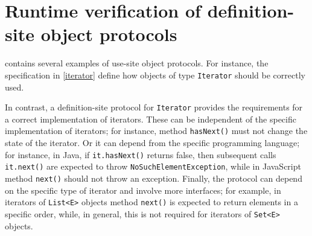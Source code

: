 \section{Runtime verification of definition-site object protocols}\label{definition-site}

 contains several examples of use-site object protocols.
For instance, the specification in \cref{iterator} define how objects of type \lstinline|Iterator| should be correctly used.

In contrast, a {definition-site} protocol for \lstinline{Iterator} provides the requirements for a correct implementation of iterators. These can be independent of the specific implementation of iterators; for instance, method \lstinline{hasNext()} must not change the state of the iterator. Or it can depend from the specific programming language; for instance, in Java, if \lstinline{it.hasNext()} returns false, then subsequent calls \lstinline|it.next()| are expected to throw \lstinline|NoSuchElementException|, while in JavaScript method \lstinline{next()} should not throw an exception. Finally, the protocol can depend on the specific type of iterator and involve more interfaces; for example, in iterators of \lstinline{List<E>} objects method \lstinline|next()| is expected to return elements in a specific order, while, in general, this is not required for iterators of \lstinline{Set<E>} objects.

